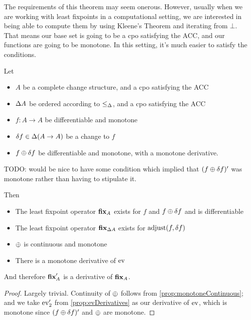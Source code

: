 The requirements of this theorem may seem onerous. However, usually when we are
working with least fixpoints in a computational setting, we are interested in
being able to compute them by using Kleene's Theorem and iterating from $\bot$.
That means our base set is going to be a cpo satisfying the ACC, and our
functions are going to be monotone. In this setting, it's much easier to satisfy
the conditions.

\begin{prop}
  Let
  \begin{itemize}
    \item $A$ be a complete change structure, and a cpo satisfying the ACC
    \item $\Delta A$ be ordered according to $\leq_\Delta$, and a cpo
      satisfying the ACC
    \item $f: A \rightarrow A$ be differentiable and monotone
    \item $\delta f \in \Delta (A \rightarrow A)$ be a change to $f$
    \item$f \oplus \delta f$ be differentiable and monotone, with a monotone derivative.
  \end{itemize}

  TODO: would be nice to have some condition which implied that $(f
    \oplus \delta f)'$ was monotone rather than having to stipulate it.

  Then
  \begin{itemize}
    \item The least fixpoint operator $\textbf{fix}_A$ exists for $f$ and $f \oplus
      \delta f$ and is differentiable
    \item The least fixpoint operator $\textbf{fix}_{\Delta A}$ exists for
      $\operatorname{adjust}(f, \delta f)$
    \item $\oplus$ is continuous and monotone
    \item There is a monotone derivative of $\operatorname{ev}$
  \end{itemize}

  And therefore $\textbf{fix}_A'$ is a derivative of $\textbf{fix}_A$.
\end{prop}
\begin{proof}
  Largely trivial. Continuity of $\oplus$ follows from
  \cref{prop:monotoneContinuous}; and we take $\operatorname{ev}'_2$ from
  \cref{prop:evDerivatives} as our derivative of $\operatorname{ev}$, which is monotone 
  since $(f \oplus \delta f)'$ and $\oplus$ are monotone.
\end{proof}

